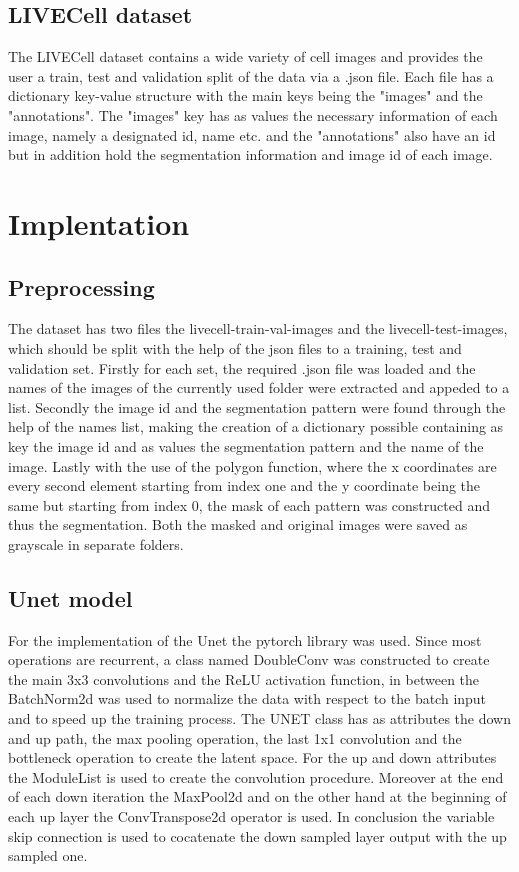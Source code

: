 \documentclass{article}
\begin{document}
\begin{multicols}{2}
\subsection{LIVECell dataset}
The LIVECell dataset contains a wide variety of cell images and provides the user a train, test and validation split of the data via a 
.json file. Each file has a dictionary key-value structure with the main keys being the "images" and the "annotations". The "images" key has
as values the necessary information of each image, namely a designated id, name etc. and the "annotations" also have an id but in addition
hold the segmentation information and image id of each image.

\section{Implentation} 
\subsection{Preprocessing}
The dataset has two files the livecell-train-val-images and the livecell-test-images, which should be split with the help of the json files to a 
training, test and validation set. Firstly for each set, the required .json file was loaded and the names of the images of the currently used folder 
were extracted and appeded to a list. Secondly the image id and the segmentation pattern were found through the help of the names list, making 
the creation of a dictionary possible containing as key the image id and as values the segmentation pattern and the name of the image. Lastly
with the use of the polygon function, where the x coordinates are every second element starting from index one and the y coordinate being the 
same but starting from index 0, the mask of each pattern was constructed and thus the segmentation. Both the masked and original images were 
saved as grayscale in separate folders.

\subsection{Unet model}
For the implementation of the Unet the pytorch library was used. Since most operations are recurrent, a class named DoubleConv was constructed to create the main 
3x3 convolutions and the ReLU activation function, in between the BatchNorm2d was used to normalize the data with respect to the batch input and to
speed up the training process. The UNET class has as attributes the down and up path, the max pooling operation, the last 1x1 convolution and the 
bottleneck operation to create the latent space. For the up and down attributes the ModuleList is used to create the convolution procedure. Moreover 
at the end of each down iteration the MaxPool2d and on the other hand at the beginning of each up layer the ConvTranspose2d operator is used. In 
conclusion the variable skip connection is used to cocatenate the down sampled layer output with the up sampled one.   


\end{multicols}
\end{document}
